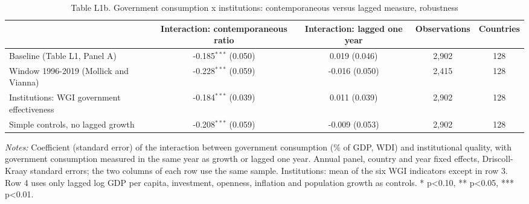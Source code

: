 \begin{table}[htbp]\centering\footnotesize
\providecommand{\sym}[1]{\ensuremath{^{#1}}}
\caption{Table L1b. Government consumption x institutions: contemporaneous versus lagged measure, robustness}\label{tab:TableL1b_frequency_robustness}
\begin{tabular}{l*{4}{c}}
\toprule
 & Interaction: contemporaneous ratio & Interaction: lagged one year & Observations & Countries \\
\midrule
Baseline (Table L1, Panel A) & -0.185\sym{***} (0.050) & 0.019 (0.046) & 2,902 & 128 \\
Window 1996-2019 (Mollick and Vianna) & -0.228\sym{***} (0.059) & -0.016 (0.050) & 2,415 & 128 \\
Institutions: WGI government effectiveness & -0.184\sym{***} (0.039) & 0.011 (0.039) & 2,902 & 128 \\
Simple controls, no lagged growth & -0.208\sym{***} (0.059) & -0.009 (0.053) & 2,902 & 128 \\
\bottomrule
\end{tabular}
\begin{minipage}{0.95\linewidth}\vspace{4pt}\scriptsize \textit{Notes:} Coefficient (standard error) of the interaction between government consumption (\% of GDP, WDI) and institutional quality, with government consumption measured in the same year as growth or lagged one year. Annual panel, country and year fixed effects, Driscoll-Kraay standard errors; the two columns of each row use the same sample. Institutions: mean of the six WGI indicators except in row 3. Row 4 uses only lagged log GDP per capita, investment, openness, inflation and population growth as controls. * p<0.10, ** p<0.05, *** p<0.01.\end{minipage}
\end{table}
